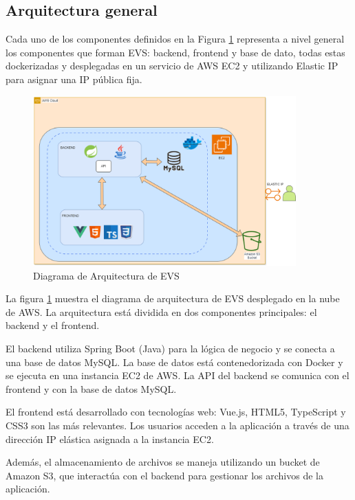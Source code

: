 \subsection{Arquitectura general}
Cada uno de los componentes definidos en la Figura \ref{fig:mvc_architecture} representa a nivel general los componentes que forman EVS: backend, frontend y base de dato, todas
estas dockerizadas y desplegadas en un servicio de AWS EC2 y utilizando Elastic IP para asignar una IP pública fija.

\begin{figure}[h]
    \centering
    \includegraphics[width=0.9\textwidth]{Aquitectura1.png} 
    \caption{Diagrama de Arquitectura de EVS}
    \label{fig:mvc_architecture}
\end{figure}



La figura \ref{fig:mvc_architecture} muestra el diagrama de arquitectura de EVS desplegado en la nube de AWS. La arquitectura está dividida en dos componentes principales: el backend y el frontend.

El backend utiliza Spring Boot (Java) para la lógica de negocio y se conecta a una base de datos MySQL. La base de datos está contenedorizada con Docker y se ejecuta en una
instancia EC2 de AWS. La API del backend se comunica con el frontend y con la base de datos MySQL.

El frontend está desarrollado con tecnologías web: Vue.js, HTML5, TypeScript y CSS3 son las más relevantes. Los usuarios acceden a la aplicación a través de una dirección 
IP elástica asignada a la instancia EC2.

Además, el almacenamiento de archivos se maneja utilizando un bucket de Amazon S3, que interactúa con el backend para gestionar los archivos de la aplicación.

